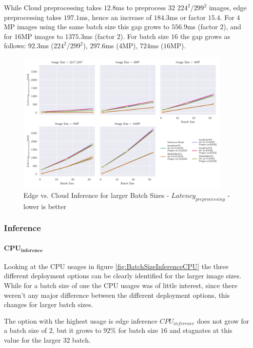 While Cloud preprocessing takes $12.8$ms to preprocess $32$ $224^2/299^2$ images, edge preprocessing takes $197.1$ms, hence an increase of $184.3$ms or factor $15.4$. For $4$MP images using the same batch size this gap grows to $556.9$ms (factor $2$), and for $16$MP images to $1375.3$ms (factor $2$).
For batch size $16$ the gap grows as follows: $92.3$ms ($224^2/299^2$), $297.6$ms ($4$MP), $724$ms ($16$MP).


\begin{figure}[!htb]
\centering
\includegraphics[width=0.95\textwidth]{./Bilder/single_plots/batch_size_plots/Effects_of_Batch_size_Preprocessing_Latencies.pdf}
\caption{Edge vs. Cloud Inference for larger Batch Sizes -  $Latency_{preprocessing}$ - lower is better}
\label{fig:BatchSizePreproLatency}
\end{figure}



\FloatBarrier
\subsubsection{Inference}

\paragraph{$\mathbf{CPU_{inference}}$}
Looking at the CPU usages in figure \ref{fig:BatchSizeInferenceCPU} the three different deployment options can be clearly identified for the larger image sizes.
While for a batch size of one the CPU usages was of little interest, since there weren't any major difference between the different deployment options, this changes for larger batch sizes.

The option with the highest usage is edge inference $CPU_{inference}$ does not grow for a batch size of $2$, but it grows to $92\%$ for batch size $16$ and stagnates at this value for the larger $32$ batch.

